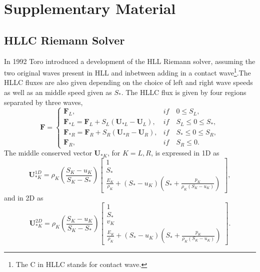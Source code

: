 \chapter{Supplementary Material}
\label{ap:supp}
\graphicspath{{image_directory/appendix/}}

\section{HLLC Riemann Solver}
\label{ap:HLLCriemann}

	In 1992 Toro \cite{Toro92} introduced a development of the HLL Riemann solver, assuming the two original waves present in HLL and inbetween adding in a contact wave\footnote{The C in HLLC stands for contact wave.}.The HLLC fluxes are also given depending on the choice of left and right wave speeds as well as an middle speed given as $S_*$. The HLLC flux is given by four regions separated by three waves,
	\begin{equation}
		\mathbf{F}=
		\begin{cases}
			\mathbf{F}_L, & if \quad 0\leq S_L, \\
			\mathbf{F}_{*L}=\mathbf{F}_L+S_L\left(\mathbf{U}_{*L}-\mathbf{U}_L\right), & if \quad S_L\leq0\leq S_*, \\
			\mathbf{F}_{*R}=\mathbf{F}_R+S_R\left(\mathbf{U}_{*R}-\mathbf{U}_R\right), & if \quad S_*\leq0\leq S_R, \\
			\mathbf{F}_R, & if \quad S_R\leq0.
		\end{cases}
		\nonumber
	\end{equation}
	The middle conserved vector $\mathbf{U}_{*K}$, for $K=L,R$, is expressed in 1D as
	\begin{equation}
		\mathbf{U}_{*K}^{1D}=\rho_K\left(\frac{S_K-u_K}{S_K-S_*}\right)
		\left[
		\begin{matrix}
			1\\
			S_*\\
			\frac{E_K}{\rho_K}+\left(S_*-u_K\right)\left(S_*+\frac{p_K}{\rho_K\left(S_K-u_K\right)}\right)
		\end{matrix}
		\right],
		\nonumber
	\end{equation}
	and in 2D as
	\begin{equation}
		\mathbf{U}_{*K}^{2D}=\rho_K\left(\frac{S_K-u_K}{S_K-S_*}\right)
		\left[
		\begin{matrix}
			1\\
			S_*\\
			v_K \\
			\frac{E_K}{\rho_K}+\left(S_*-u_K\right)\left(S_*+\frac{p_K}{\rho_K\left(S_K-u_K\right)}\right)
		\end{matrix}
		\right].
		\nonumber
	\end{equation}
